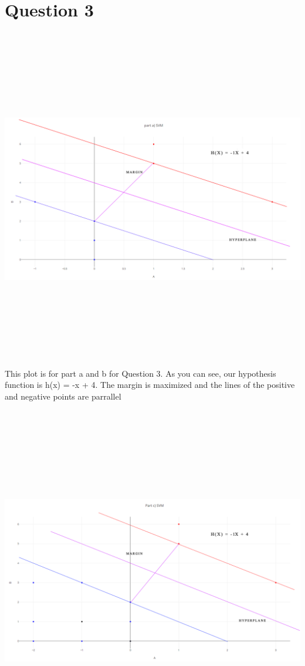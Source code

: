 \documentclass{article}
\begin{document}
\section{Question 3}
\includegraphics[width=15cm,height=15cm,keepaspectratio]{"Question3AIa"}
This plot is for part a and b for Question 3. As you can see, our hypothesis function is h(x) = -x + 4. The margin is maximized and the lines of the positive and negative points are parrallel 
\\
\\
\includegraphics[width=15cm,height=15cm,keepaspectratio]{"Question3AIc"}
\end{document}
